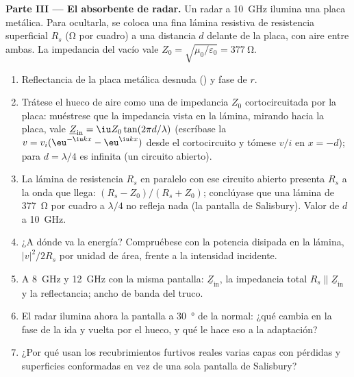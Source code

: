 \begin{problem}
\medskip
\noindent\textbf{Parte III --- El absorbente de radar.}
Un radar a \qty{10}{GHz} ilumina una placa metálica. Para ocultarla, se coloca una fina
lámina resistiva de resistencia superficial $R_s$ (\unit{\ohm} por cuadro)
a una distancia $d$ delante de la placa, con aire entre ambas.
La impedancia del vacío vale $Z_0 = \sqrt{\mu_0/\varepsilon_0} = \qty{377}{\ohm}$.
\begin{enumerate}[resume]
  \item Reflectancia de la placa metálica desnuda () y
        fase de $r$.
  \item Trátese el hueco de aire como una  de impedancia $Z_0$
        cortocircuitada por la placa: muéstrese que la impedancia vista en la
        lámina, mirando hacia la placa, vale $\underline Z_{\text{in}} = \iu Z_0
        \tan(2\pi d/\lambda)$ (escríbase la  $v = v_i(\eu^{-\iu kx} -
        \eu^{\iu kx})$ desde el cortocircuito y tómese $v/i$ en $x = -d$); para $d =
        \lambda/4$ es infinita (un circuito abierto).
  \item La lámina de resistencia $R_s$ en paralelo con ese circuito
        abierto presenta $R_s$ a la onda que llega:  $(R_s - Z_0)/(R_s + Z_0)$; conclúyase que una lámina de
        \qty{377}{\ohm} por cuadro a $\lambda/4$ no refleja nada (la
        pantalla de Salisbury). Valor de $d$ a \qty{10}{GHz}.
  \item ¿A dónde va la energía? Compruébese con la potencia disipada
        en la lámina, $|v|^2/2R_s$ por unidad de área, frente a la intensidad
        incidente.
  \item A \qty{8}{GHz} y \qty{12}{GHz} con la misma pantalla: $\underline Z_{\text{in}}$,
        la impedancia total $R_s \parallel \underline Z_{\text{in}}$ y la
        reflectancia; ancho de banda del truco.
  \item El radar ilumina ahora la pantalla a \qty{30}{\degree} de
        la normal: ¿qué cambia en la fase de la ida y vuelta
        por el hueco, y qué le hace eso a la adaptación?
  \item ¿Por qué usan los recubrimientos furtivos reales varias capas con pérdidas
        y superficies conformadas en vez de una sola pantalla de Salisbury?
\end{enumerate}


\end{problem}
